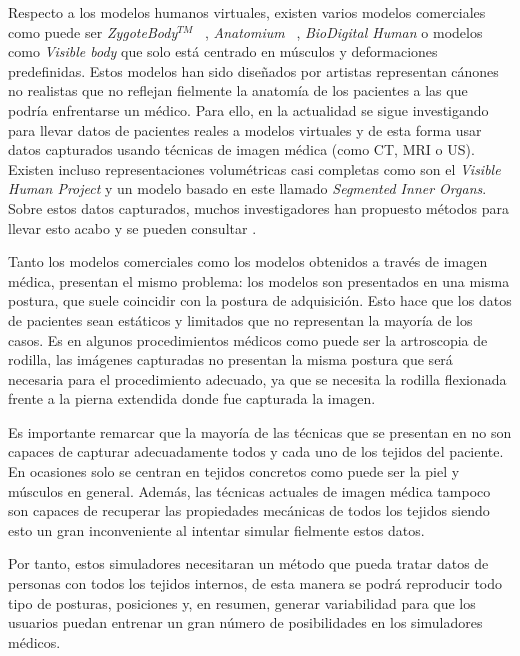 Respecto a los modelos humanos virtuales, existen varios modelos comerciales como puede ser \emph{ZygoteBody}$^{TM}$ ~\cite{kelc2012zygote}, \emph{Anatomium} ~\cite{Anatomium},   \emph{BioDigital Human} \cite{qualter2012biodigital}o modelos como \emph{Visible body}\cite{visible2012visible} que solo está centrado en músculos y deformaciones predefinidas. Estos modelos han sido  diseñados por artistas representan cánones no realistas que no reflejan fielmente la anatomía de los pacientes a las que podría enfrentarse un médico. Para ello, en la actualidad se sigue investigando para llevar datos de pacientes reales a modelos virtuales y de esta forma usar datos capturados usando técnicas de imagen médica (como CT, MRI o US). Existen incluso representaciones volumétricas casi completas como son el \emph{Visible Human Project}\cite{ackerman1998visible}  y un modelo basado en este llamado \emph{Segmented Inner Organs}\cite{VoxelMan}. Sobre estos datos capturados, muchos investigadores han propuesto métodos para llevar esto acabo y se pueden consultar \cite{ferrante2017slice}.

Tanto los modelos comerciales como los modelos obtenidos a través de imagen médica, presentan el mismo problema: los modelos son presentados en una misma postura, que suele coincidir con la postura de adquisición. Esto hace que los datos de pacientes sean estáticos y limitados que no representan la mayoría de los casos. Es en algunos procedimientos médicos como puede ser la artroscopia de rodilla, las imágenes capturadas no presentan la misma postura que será necesaria para el procedimiento adecuado, ya que se necesita la rodilla flexionada frente a la pierna extendida donde fue capturada la imagen. 

Es importante remarcar que la mayoría de las técnicas que se presentan en \cite{ferrante2017slice} no son capaces de capturar adecuadamente todos y cada uno de los tejidos del paciente. En ocasiones solo se centran en tejidos concretos como puede ser la piel y músculos en general. Además, las técnicas actuales de imagen médica tampoco son capaces de recuperar las propiedades mecánicas de todos los tejidos siendo esto un gran inconveniente al intentar simular fielmente estos datos.

Por tanto, estos simuladores necesitaran un método que pueda tratar datos de personas con todos los tejidos internos, de esta manera se podrá reproducir todo tipo de posturas, posiciones y, en resumen, generar variabilidad para que los usuarios puedan entrenar un gran número de posibilidades en los simuladores médicos.




